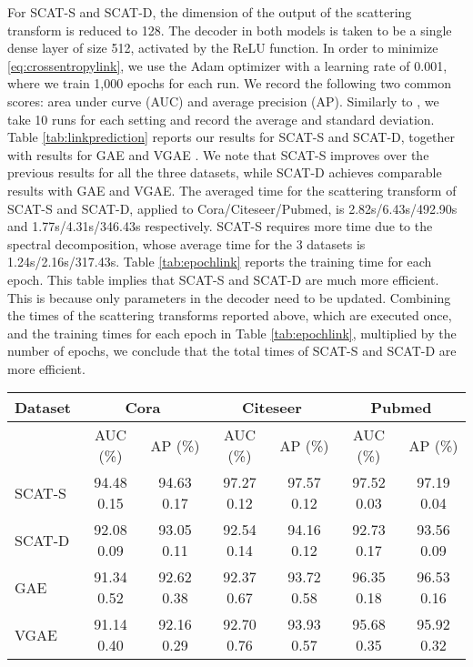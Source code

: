\documentclass[conference]{IEEEtran}
\begin{document}
For SCAT-S and SCAT-D, the dimension of the output of the scattering transform is reduced to 128. 
The decoder  in both models is taken to be a single dense layer of size 512, activated by the ReLU function.   In order to minimize \eqref{eq:crossentropylink}, we use the Adam optimizer \cite{kingma2014adam} with a learning rate of 0.001, where we train 1,000 epochs for each run. We record the following two common scores: area under curve (AUC) and average precision (AP).  Similarly to \cite{kipf2016variational}, we take 10 runs for each setting and record the average and standard deviation. 
Table \ref{tab:linkprediction} reports our results for SCAT-S and SCAT-D, together with results for GAE and VGAE \cite{kipf2016variational}.
We note that SCAT-S improves over the previous results for all the three datasets, while SCAT-D achieves comparable results with GAE and VGAE. The averaged time for the scattering transform of SCAT-S and SCAT-D, applied to Cora/Citeseer/Pubmed, is {2.82s/6.43s/492.90s} and {1.77s/4.31s/346.43s} respectively. SCAT-S requires more time due to the spectral decomposition, whose average time for the 3 datasets is {1.24s/2.16s/317.43s}. Table \ref{tab:epochlink} reports the training time for each epoch. This table implies that SCAT-S and SCAT-D are much more efficient. This is because only parameters in the decoder need to be updated. 
Combining the times of the scattering transforms reported 
above, which are executed once, and the training times for each epoch in Table \ref{tab:epochlink}, multiplied by the number of epochs, we conclude that the total times of SCAT-S and SCAT-D are more efficient.

\begin{table*}[ht]
\centering
\caption{Results for link prediction using the citation datasets. We report the mean and standard deviation over 10 runs for each setting. All models for the same dataset are trained based on the same training and validating links.} 
\small
 \begin{tabular}{| l | c c | c c | c c |} 
 \hline
 Dataset & \multicolumn{2}{|c|}{Cora} & \multicolumn{2}{|c|}{Citeseer} & \multicolumn{2}{|c|}{Pubmed} \\
 \hline
  & AUC (\%) & AP (\%) & AUC (\%)  & AP (\%) & AUC (\%)  & AP (\%)  \\ [0.5ex] 
 \hline
SCAT-S & 94.48  0.15 & 94.63  0.17 &  97.27  0.12 & 97.57  0.12 &  97.52  0.03 & 97.19  0.04  \\
 \hline
SCAT-D & 92.08  0.09 & 93.05  0.11 &  92.54  0.14 & 94.16  0.12 &  92.73  0.17 & 93.56  0.09  \\
 \hline
 GAE  &  91.34  0.52 & 92.62  0.38 &  92.37  0.67 & 93.72  0.58 & 96.35  0.18 & 96.53  0.16 \\
 \hline
VGAE & 91.14  0.40 & 92.16  0.29 &  92.70  0.76 & 93.93  0.57 &  95.68  0.35 & 95.92  0.32 \\
 \hline
\end{tabular}
\label{tab:linkprediction}
\end{table*}
\end{document}
